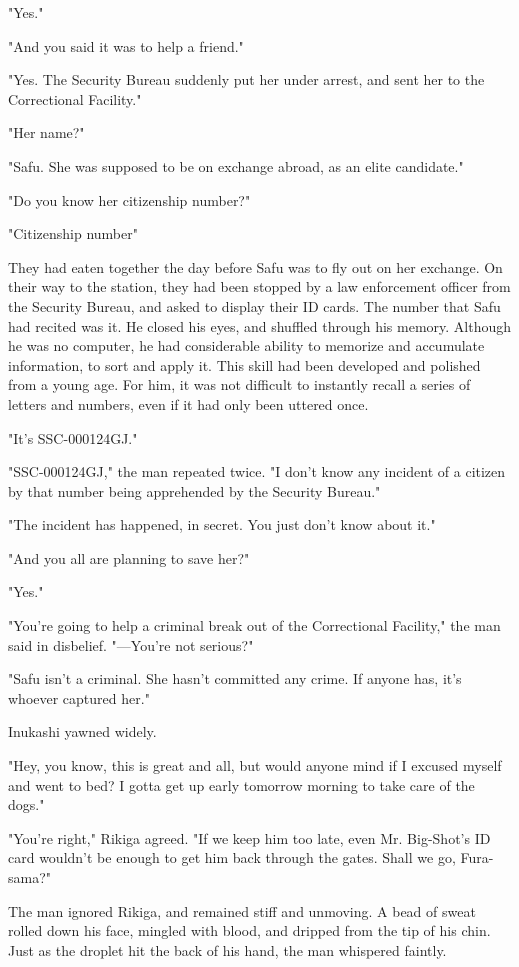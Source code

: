 "Yes."

"And you said it was to help a friend."

"Yes. The Security Bureau suddenly put her under arrest, and sent her to
the Correctional Facility."

"Her name?"

"Safu. She was supposed to be on exchange abroad, as an elite
candidate."

"Do you know her citizenship number?"

"Citizenship number\el "

They had eaten together the day before Safu was to fly out on her
exchange. On their way to the station, they had been stopped by a law
enforcement officer from the Security Bureau, and asked to display their
ID cards. The number that Safu had recited was it. He closed his eyes,
and shuffled through his memory. Although he was no computer, he had
considerable ability to memorize and accumulate information, to sort and
apply it. This skill had been developed and polished from a young age.
For him, it was not difficult to instantly recall a series of letters
and numbers, even if it had only been uttered once.

"It's SSC-000124GJ."

"SSC-000124GJ," the man repeated twice. "I don't know any incident of a
citizen by that number being apprehended by the Security Bureau."

"The incident has happened, in secret. You just don't know about it."

"And you all are planning to save her?"

"Yes."

"You're going to help a criminal break out of the Correctional
Facility," the man said in disbelief. "---You're not serious?"

"Safu isn't a criminal. She hasn't committed any crime. If anyone has,
it's whoever captured her."

Inukashi yawned widely.

"Hey, you know, this is great and all, but would anyone mind if I
excused myself and went to bed? I gotta get up early tomorrow morning to
take care of the dogs."

"You're right," Rikiga agreed. "If we keep him too late, even Mr.
Big-Shot's ID card wouldn't be enough to get him back through the gates.
Shall we go, Fura-sama?"

The man ignored Rikiga, and remained stiff and unmoving. A bead of sweat
rolled down his face, mingled with blood, and dripped from the tip of
his chin. Just as the droplet hit the back of his hand, the man
whispered faintly.

